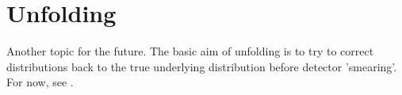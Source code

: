 \section{Unfolding}
Another topic for the future.  The basic aim of unfolding is to try to correct distributions back to the true underlying distribution before  detector 'smearing'.  For now, see \cite{Prosper:1306523,DAgostini1995487,Adye:2011gm,Malaescu:2011yg,Blobel:2002pu,Hocker:1995kb,Choudalakis2012,Tikhonov}.
